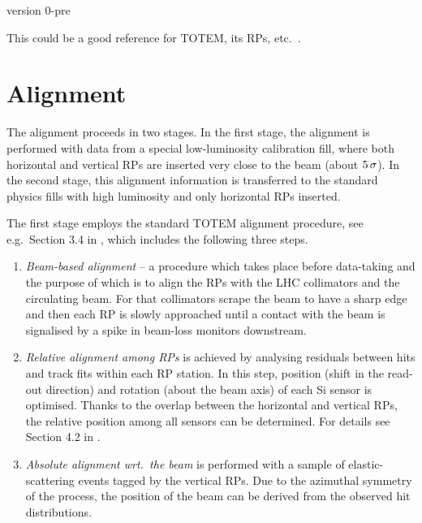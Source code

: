 \documentclass{article}
\def\un#1{\,{\rm #1}}
\begin{document}
\centerline{version 0-pre}
\vskip2cm


This could be a good reference for TOTEM, its RPs, etc.~\cite{totem-jinst}.

\section{Alignment}
\label{s:alignment}

The alignment proceeds in two stages. In the first stage, the alignment is performed with data from a special low-luminosity calibration fill, where both horizontal and vertical RPs are inserted very close to the beam (about $5\un{\sigma}$). In the second stage, this alignment information is transferred to the standard physics fills with high luminosity and only horizontal RPs inserted.

The first stage employs the standard TOTEM alignment procedure, see e.g.~Section 3.4 in \cite{totem-ijmp}, which includes the following three steps.
\begin{enumerate}[noitemsep]
\item {\em Beam-based alignment} -- a procedure which takes place before data-taking and the purpose of which is to align the RPs with the LHC collimators and the circulating beam. For that collimators scrape the beam to have a sharp edge and then each RP is slowly approached until a contact with the beam is signalised by a spike in beam-loss monitors downstream.
\item {\em Relative alignment among RPs} is achieved by analysing residuals between hits and track fits within each RP station. In this step, position (shift in the read-out direction) and rotation (about the beam axis) of each Si sensor is optimised. Thanks to the overlap between the horizontal and vertical RPs, the relative position among all sensors can be determined. For details see Section 4.2 in \cite{jan_thesis}.
\item {\em Absolute alignment wrt.~the beam} is performed with a sample of elastic-scattering events tagged by the vertical RPs. Due to the azimuthal symmetry of the process, the position of the beam can be derived from the observed hit distributions.
\end{enumerate}
\end{document}
